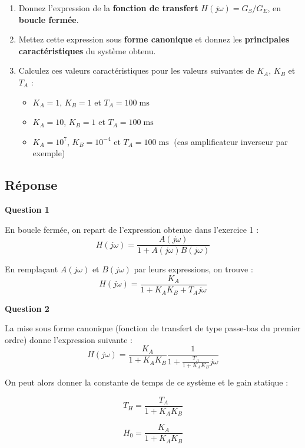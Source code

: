 \documentclass[a4paper,11pt,twoside]{book} %
\begin{document}
\begin{enumerate}
	\item Donnez l'expression de la \textbf{fonction de transfert} $H(j \omega) = G_S / G_E$, en \textbf{boucle fermée}. 
	\item Mettez cette expression sous \textbf{forme canonique} et donnez les \textbf{principales caractéristiques} du système obtenu.
	\item Calculez ces valeurs caractéristiques pour les valeurs suivantes de $K_A$, $K_B$ et $T_A$ :
	\begin{itemize}
		\item $K_A = 1$, $K_B = 1$ et $T_A = 100\operatorname{ms}$
		\item $K_A = 10$, $K_B = 1$ et $T_A = 100\operatorname{ms}$
		\item $K_A = 10^7$, $K_B = 10^{-4}$ et $T_A = 100\operatorname{ms}$ (cas amplificateur inverseur par exemple)
	\end{itemize}
\end{enumerate}


\subsection*{Réponse}

\medskip
\textbf{Question 1}

En boucle fermée, on repart de l'expression obtenue dans l'exercice 1 : $$H(j \omega) = \frac{A(j \omega)}{1 + A(j \omega) B(j \omega)}$$

En remplaçant $A(j \omega)$ et $B(j \omega)$ par leurs expressions, on trouve : $$\boxed{H(j \omega) = \frac{K_A}{1 + K_A K_B + T_A j \omega}} $$


\noindent\hrulefill

\medskip
\textbf{Question 2}

La mise sous forme canonique (fonction de transfert de type passe-bas du premier ordre) donne l'expression suivante : $$\boxed{H(j \omega) = \frac{K_A}{1 + K_A K_B} \frac{1}{1 + \frac{T_A}{1 + K_A K_B} j \omega}}$$

\medskip

On peut alors donner la constante de temps de ce système et le gain statique :

$$\boxed{T_H = \frac{T_A}{1 + K_A K_B}}$$

$$\boxed{H_0 = \frac{K_A}{1 + K_A K_B}}$$


\noindent\hrulefill
\end{document}
